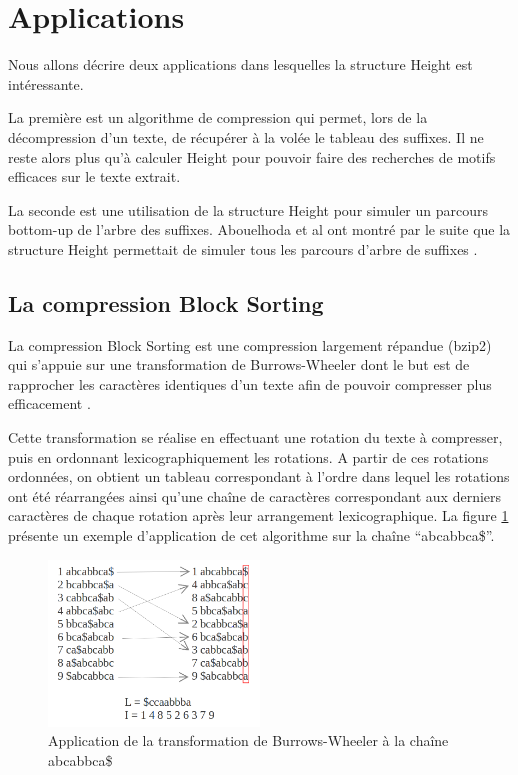 \documentclass[a4paper,10pt]{article}
\begin{document}
\section{Applications}
\label{sec:appli}

Nous allons décrire deux applications dans lesquelles la structure
Height est intéressante. 

La première est un algorithme de compression
qui permet, lors de la décompression d'un texte, de récupérer à la
volée le tableau des suffixes. Il ne reste alors plus qu'à calculer
Height pour pouvoir faire des recherches de motifs efficaces sur le
texte extrait.

La seconde est une utilisation de la structure Height pour simuler un
parcours bottom-up de l'arbre des suffixes. Abouelhoda et al ont
montré par le suite que la structure Height permettait de simuler tous
les parcours d'arbre de suffixes \cite{Abouelhoda200453}.

\subsection{La compression Block Sorting}
\label{sec:blocksorting}

La compression Block Sorting est une compression largement répandue
(bzip2) qui s'appuie sur une transformation de Burrows-Wheeler
dont le but est de rapprocher les caractères identiques d'un texte
afin de pouvoir compresser plus efficacement \cite{Burrows94}.

Cette transformation se réalise en effectuant une rotation du texte à
compresser, puis en ordonnant lexicographiquement les rotations. A
partir de ces rotations ordonnées, on obtient un tableau correspondant
à l'ordre dans lequel les rotations ont été réarrangées ainsi qu'une
chaîne de caractères correspondant aux derniers caractères de chaque
rotation après leur arrangement lexicographique. La figure
\ref{fig:burrows} présente un exemple d'application de cet algorithme
sur la chaîne ``abcabbca\$''. 

\begin{figure}
  \centering
  \includegraphics[width=0.5\textwidth]{full_burrows}
  \caption{Application de la transformation de Burrows-Wheeler à la
    chaîne abcabbca\$}
  \label{fig:burrows}
\end{figure}
\end{document}
